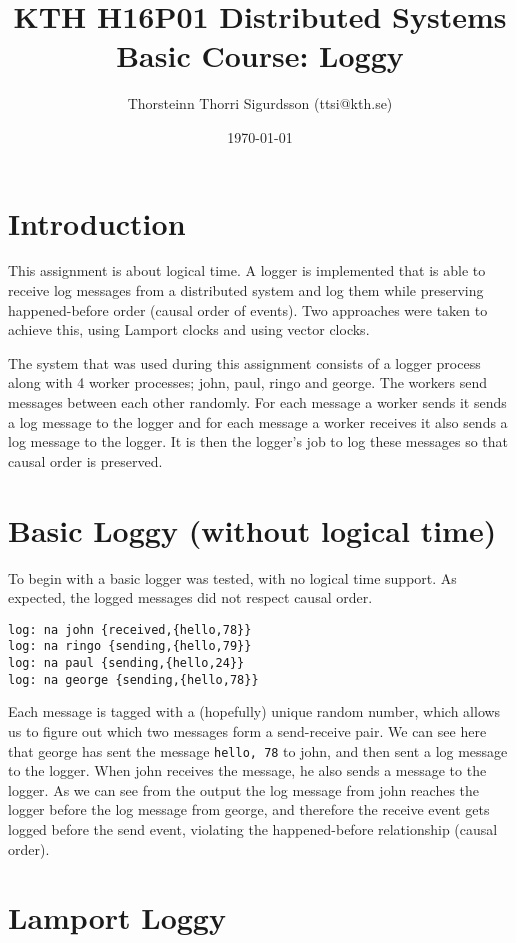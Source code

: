 \documentclass[a4paper, 11pt]{article}
\title{KTH H16P01 Distributed Systems Basic Course: Loggy}
\author{Thorsteinn Thorri Sigurdsson (ttsi@kth.se)}
\date{\today{}}
\begin{document}
\maketitle

\section{Introduction}

This assignment is about logical time. A logger is implemented that is able to receive log messages from a distributed system and log them while preserving happened-before order (causal order of events). Two approaches were taken to achieve this, using Lamport clocks and using vector clocks.

The system that was used during this assignment consists of a logger process along with 4 worker processes; john, paul, ringo and george. The workers send messages between each other randomly. For each message a worker sends it sends a log message to the logger and for each message a worker receives it also sends a log message to the logger. It is then the logger's job to log these messages so that causal order is preserved.


\section{Basic Loggy (without logical time)}

To begin with a basic logger was tested, with no logical time support. As expected, the logged messages did not respect causal order.

\begin{verbatim}
log: na john {received,{hello,78}}
log: na ringo {sending,{hello,79}}
log: na paul {sending,{hello,24}}
log: na george {sending,{hello,78}}
\end{verbatim}

Each message is tagged with a (hopefully) unique random number, which allows us to figure out which two messages form a send-receive pair.
We can see here that george has sent the message \texttt{hello, 78} to john, and then sent a log message to the logger. When john receives the message, he also sends a message to the logger. As we can see from the output the log message from john reaches the logger before the log message from george, and therefore the receive event gets logged before the send event, violating the happened-before relationship (causal order).

\section{Lamport Loggy}
\end{document}
